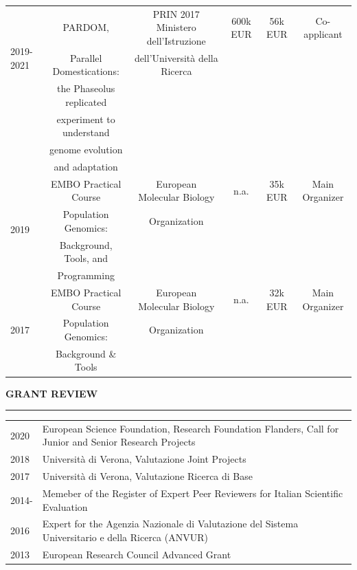 \documentclass[openany]{book}
\begin{document}
\begin{table}[ht]
{\begin{tabular}{ |l | c | c | c | c | c | }
\multirow{3}{*}{2019-2021} & PARDOM, & PRIN 2017 Ministero dell'Istruzione & 600k EUR & 56k EUR & Co-applicant \\ 
& Parallel Domestications:  & dell'Universit\`{a} della Ricerca &  & & \\
& the Phaseolus replicated & & & & \\ 
&  experiment to understand &  & & & \\ 
& genome evolution &  &  &  &  \\  
& and adaptation & & & & \\ \hline

\multirow{4}{*}{2019}  & EMBO Practical Course  & European Molecular Biology & n.a. & 35k EUR & Main Organizer \\
& Population Genomics:   & Organization &  & & \\
& Background, Tools, and &  &  & & \\
& Programming &  &  & & \\\hline

\multirow{3}{*}{2017}  & EMBO Practical Course  & European Molecular Biology & n.a. & 32k EUR & Main Organizer \\
& Population Genomics:   & Organization &  & & \\
& Background \& Tools&  &  & & \\\hline

\end{tabular}}
\end{table} 
\newline 

\vspace{0.05cm}
\noindent
\MakeUppercase{\textbf{Grant review}} \vspace{0.2cm}
\sectionlineskip
\hrule
\vspace{0.2cm}
\noindent
\begin{tabular}{ l l }
2020 & European Science Foundation, Research Foundation Flanders, Call for Junior and Senior Research Projects\\ 
2018 & Universit\`{a} di Verona, Valutazione Joint Projects\\
2017 & Universit\`{a} di Verona, Valutazione Ricerca di Base\\
2014- & Memeber of the Register of Expert Peer Reviewers for Italian Scientific Evaluation\\
2016 & Expert for the Agenzia Nazionale di Valutazione del Sistema Universitario e della Ricerca (ANVUR)\\ 
2013 & European Research Council Advanced Grant\\
\end{tabular}
\newline 
\end{document}
